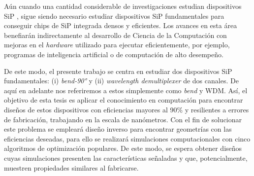 
Aún cuando una cantidad considerable de investigaciones estudian dispositivos
SiP \citep{Su2018, Malheiros-Silveira2020}, sigue siendo necesario estudiar dispositivos SiP
fundamentales para conseguir chips de SiP integrada densos y eficientes.
Los avances en esta área benefiarán indirectamente al desarrollo de Ciencia de
la Computación con mejoras en el \emph{hardware} utilizado para ejecutar
eficientemente, por
ejemplo, programas de inteligencia artificial o de computación de alto
desempeño.

De este modo, el presente trabajo se centra en estudiar dos dispositivos SiP
fundamentales:
(i) \emph{bend-90°} y (ii) \emph{wavelength demultiplexer} de dos canales.
De aquí en adelante nos referiremos a estos simplemente como \emph{bend} y WDM.
Así, el objetivo de esta tesis es aplicar el conocimiento en computación para
encontrar diseños de estos dispositivos con eficiencias mayores al 90\%
y resilientes a errores de fabricación, trabajando en la escala de nanómetros.
Con el fin de solucionar este problema se empleará diseño inverso para encontrar geometrías con las eficiencias deseadas, 
para ello se realizará simulaciones computacionales con cinco algoritmos de optimización populares. 
De este modo, se espera obtener diseños cuyas simulaciones presenten las características señaladas y 
que, potencialmente, muestren propiedades similares al fabricarse.








